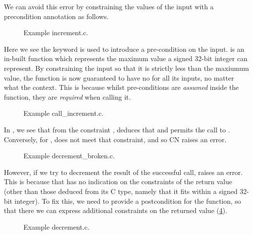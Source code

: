We can avoid this error by constraining the values of the input with a
precondition annotation as follows.

\begin{figure}[h]
    \centering
    \caption{Example increment.c.}\label{fig:incr}
\end{figure}

Here we see the keyword  is used to introduce a pre-condition
on the input.  is an in-built function which represents the maximum
value a signed 32-bit integer can represent. By constraining the input so that
it is strictly less than the maxiumum value, the function is now guaranteed to
have no  for all its inputs, no matter what the context. This is because
whilst pre-conditions are \emph{assumed} inside the function, they are
\emph{required} when calling it.

\begin{figure}[h]
    \centering
    \caption{Example call\_increment.c.}\label{fig:call-incr}
\end{figure}

In , we see that from the constraint ,  deduces that  and permits
the call to . Conversely, for ,
 does not meet that constraint, and so CN raises an error.

\begin{figure}[h]
    \centering
    \caption{Example decrement\_broken.c.}\label{fig:decr-broken}
\end{figure}

However, if we try to decrement the result of the successful call, 
raises an error. This is because that  has no indication on the
constraints of the return value (other than those deduced from its C type,
namely that it fits within a signed 32-bit integer). To fix this, we need to
provide a postcondition for the function, so that there we can express
additional constraints on the returned value (\cref{fig:decr}).

\begin{figure}[h]
    \centering
    \caption{Example decrement.c.}\label{fig:decr}
\end{figure}


